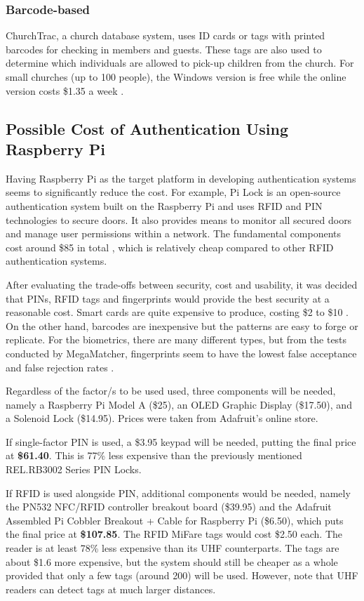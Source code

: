 \subsubsection{Barcode-based}
ChurchTrac, a church database system, uses ID cards or tags with printed barcodes for checking in members and guests. These tags are also used to determine which individuals are allowed to pick-up children from the church. For small churches (up to 100 people), the Windows version is free while the online version costs \$1.35 a week \cite{ChurchTrac}.

\subsection{Possible Cost of Authentication Using Raspberry Pi}
Having Raspberry Pi as the target platform in developing authentication systems seems to significantly reduce the cost. For example, Pi Lock is an open-source authentication system built on the Raspberry Pi and uses RFID and PIN technologies to secure doors. It also provides means to monitor all secured doors and manage user permissions within a network. The fundamental components cost around \$85 in total \cite{PiLock}, which is relatively cheap compared to other RFID authentication systems.

After evaluating the trade-offs between security, cost and usability, it was decided that PINs, RFID tags and fingerprints would provide the best security at a reasonable cost. Smart cards are quite expensive to produce, costing \$2 to \$10 \cite{CardwerkSmartCard}. On the other hand, barcodes are inexpensive but the patterns are easy to forge or replicate. For the biometrics, there are many different types, but from the tests conducted by MegaMatcher, fingerprints seem to have the lowest false acceptance and false rejection rates \cite{MegaMatcher}.

Regardless of the factor/s to be used used, three components will be needed, namely a Raspberry Pi Model A (\$25), an OLED Graphic Display (\$17.50), and a Solenoid Lock (\$14.95). Prices were taken from Adafruit's online store.

If single-factor PIN is used, a \$3.95 keypad will be needed, putting the final price at \textbf{\$61.40}. This is 77\% less expensive than the previously mentioned REL.RB3002 Series PIN Locks.

If RFID is used alongside PIN, additional components would be needed, namely the PN532 NFC/RFID controller breakout board (\$39.95) and the Adafruit Assembled Pi Cobbler Breakout + Cable for Raspberry Pi (\$6.50), which puts the final price at \textbf{\$107.85}. The RFID MiFare tags would cost \$2.50 each. The reader is at least 78\% less expensive than its UHF counterparts. The tags are about \$1.6 more expensive, but the system should still be cheaper as a whole provided that only a few tags (around 200) will be used. However, note that UHF readers can detect tags at much larger distances.

